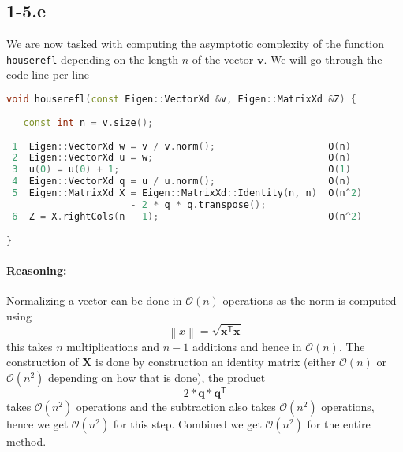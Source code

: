 \documentclass{article}
\begin{document}
\subsection*{1-5.e}
We are now tasked with computing the asymptotic complexity of the function \verb|houserefl| depending on the length $n$ of the vector $\mathbf{v}$. We will go through the code line per line

\begin{lstlisting}[language=C++,
                   directivestyle={\color{black}}
                   emph={int,char,double,float,unsigned},
                   emphstyle={\color{blue}}
                  ]
void houserefl(const Eigen::VectorXd &v, Eigen::MatrixXd &Z) {
  
   const int n = v.size();
  
 1  Eigen::VectorXd w = v / v.norm();                    O(n)
 2  Eigen::VectorXd u = w;                               O(n)
 3  u(0) = u(0) + 1;                                     O(1)
 4  Eigen::VectorXd q = u / u.norm();                    O(n)
 5  Eigen::MatrixXd X = Eigen::MatrixXd::Identity(n, n)  O(n^2)
                      - 2 * q * q.transpose();           
 6  Z = X.rightCols(n - 1);                              O(n^2)

}
\end{lstlisting}

\pagebreak

\paragraph{Reasoning:} Normalizing a vector can be done in $\mathcal{O}\left(n\right)$ operations as the norm is computed using
\begin{equation*}
    \left\lVert x\right\rVert = \sqrt{\mathbf{x}^{\mathsf{T}}\mathbf{x}}
\end{equation*}
this takes $n$ multiplications and $n-1$ additions and hence in $\mathcal{O}\left(n\right)$. 
The construction of $\mathbf{X}$ is done by construction an identity matrix (either $\mathcal{O}\left(n\right)$  or $\mathcal{O}\left(n^{2}\right)$ depending on how that is done), the product 
\begin{equation*}
    2 * \mathbf{q} * \mathbf{q^{\mathsf{T}}}
\end{equation*}
takes $\mathcal{O}\left(n^{2}\right)$ operations and the subtraction also takes $\mathcal{O}\left(n^{2}\right)$ operations, hence we get $\mathcal{O}\left(n^{2}\right)$ for this step. Combined we get $\mathcal{O}\left(n^{2}\right)$ for the entire method.
\end{document}
